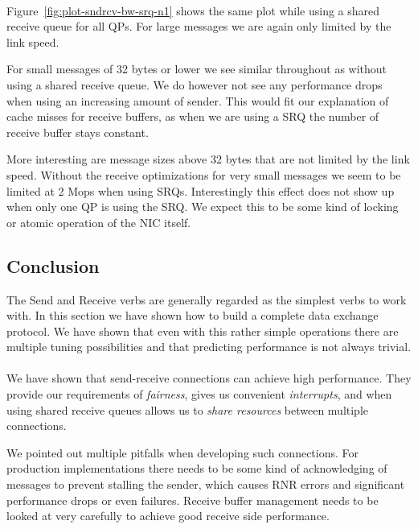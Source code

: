 \paragraph{} Figure~\ref{fig:plot-sndrcv-bw-srq-n1} shows the same plot while using a shared receive queue for all QPs. For
large messages we are again only limited by the link speed.

For small messages of 32 bytes or lower we see similar throughout
as without using a shared receive queue. We do however not see any performance drops when using an increasing amount of sender.
This would fit our explanation of cache misses for receive buffers, as when we are using a SRQ the number of receive buffer
stays constant. 


More interesting are message sizes above 32 bytes that are not limited by the link speed. Without the receive optimizations 
for very small messages we seem to be limited at 2 Mops when using SRQs. Interestingly this effect does not show up when only
one QP is using the SRQ. We expect this to be some kind of locking or atomic operation of the NIC itself.





\subsection{Conclusion}

The Send and Receive verbs are generally regarded as the simplest verbs to work with. In this section we have shown how to
build a complete data exchange protocol. We have shown that even with this rather simple operations there are multiple tuning
possibilities and that predicting performance  is not always trivial.

\paragraph{} We have shown that send-receive connections can achieve high performance. They provide our requirements of
\emph{fairness}, gives us convenient \emph{interrupts}, and when using shared receive queues allows us to 
\emph{share resources} between multiple  connections.

We pointed out multiple pitfalls when developing such connections. For production implementations there needs
to be some kind of acknowledging of messages to prevent stalling the sender, which causes RNR errors and significant 
performance drops or even failures. Receive buffer management needs to be looked at very carefully to achieve good receive
side performance.

